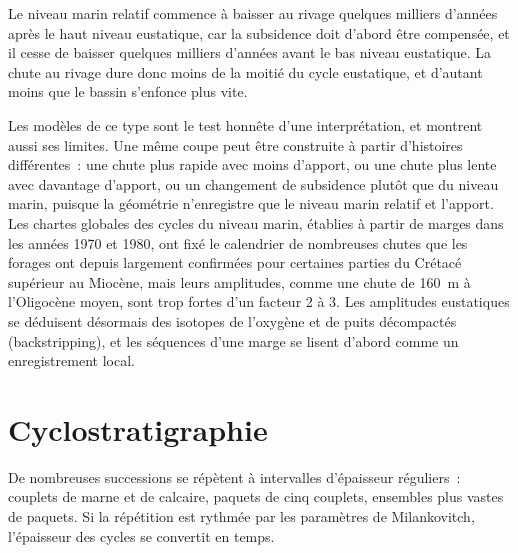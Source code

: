 \begin{omfigure}
\par{}\label{fig:b3:sequence-stratigraphy:section}
\end{omfigure}


Le niveau marin relatif commence à baisser au rivage quelques milliers d'années
après le haut niveau eustatique, car la subsidence doit d'abord être compensée,
et il cesse de baisser quelques milliers d'années avant le bas niveau eustatique. La chute
au rivage dure donc moins de la moitié du cycle eustatique, et d'autant moins que
le bassin s'enfonce plus vite.

Les modèles de ce type sont le test honnête d'une interprétation, et montrent aussi
ses limites. Une même coupe peut être construite à partir d'histoires différentes~:
une chute plus rapide avec moins d'apport, ou une chute plus lente avec davantage d'apport,
ou un changement de subsidence plutôt que du niveau marin, puisque la géométrie
n'enregistre que le niveau marin relatif et l'apport. Les chartes globales des cycles
du niveau marin, établies à partir de marges dans les années 1970 et 1980, ont fixé le
calendrier de nombreuses chutes que les forages ont depuis largement confirmées pour
certaines parties du Crétacé supérieur au Miocène, mais leurs amplitudes, comme une
chute de \qty{160}{m} à l'Oligocène moyen, sont trop fortes d'un facteur 2 à 3. Les amplitudes
eustatiques se déduisent désormais des isotopes de l'oxygène et de puits décompactés
(backstripping), et les séquences d'une marge se lisent d'abord comme un enregistrement local.

\section{Cyclostratigraphie}\label{sec:b3:sequence-stratigraphy:cyclo}

De nombreuses successions se répètent à intervalles d'épaisseur réguliers~: couplets
de marne et de calcaire, paquets de cinq couplets, ensembles plus vastes de paquets. Si
la répétition est rythmée par les paramètres de Milankovitch, l'épaisseur des
cycles se convertit en temps.

